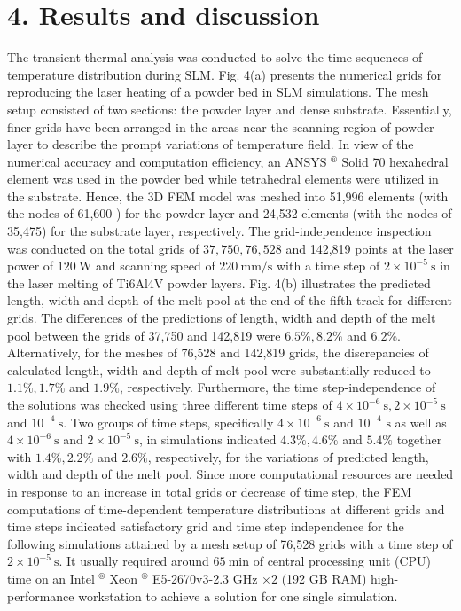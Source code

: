 \documentclass[10pt]{article}
\begin{document}
\section*{4. Results and discussion}
The transient thermal analysis was conducted to solve the time sequences of temperature distribution during SLM. Fig. 4(a) presents the numerical grids for reproducing the laser heating of a powder bed in SLM simulations. The mesh setup consisted of two sections: the powder layer and dense substrate. Essentially, finer grids have been arranged in the areas near the scanning region of powder layer to describe the prompt variations of temperature field. In view of the numerical accuracy and computation efficiency, an ANSYS ${ }^{\circledR}$ Solid 70 hexahedral element was used in the powder bed while tetrahedral elements were utilized in the substrate. Hence, the 3D FEM model was meshed into 51,996 elements (with the nodes of 61,600 ) for the powder layer and 24,532 elements (with the nodes of 35,475) for the substrate layer, respectively. The grid-independence inspection was conducted on the total grids of $37,750,76,528$ and 142,819 points at the laser power of $120 \mathrm{~W}$ and scanning speed of $220 \mathrm{~mm} / \mathrm{s}$ with a time step of $2 \times 10^{-5} \mathrm{~s}$ in the laser melting of Ti6Al4V powder layers. Fig. 4(b) illustrates the predicted length, width and depth of the melt pool at the end of the fifth track for different grids. The differences of the predictions of length, width and depth of the melt pool between the grids of 37,750 and 142,819 were $6.5 \%, 8.2 \%$ and $6.2 \%$. Alternatively, for the meshes of 76,528 and 142,819 grids, the discrepancies of calculated length, width and depth of melt pool were substantially reduced to $1.1 \%, 1.7 \%$ and $1.9 \%$, respectively. Furthermore, the time step-independence of the solutions was checked using three different time steps of $4 \times 10^{-6} \mathrm{~s}, 2 \times 10^{-5} \mathrm{~s}$ and $10^{-4} \mathrm{~s}$. Two groups of time steps, specifically $4 \times 10^{-6} \mathrm{~s}$ and $10^{-4}$ $\mathrm{s}$ as well as $4 \times 10^{-6} \mathrm{~s}$ and $2 \times 10^{-5} \mathrm{~s}$, in simulations indicated $4.3 \%, 4.6 \%$ and $5.4 \%$ together with $1.4 \%, 2.2 \%$ and $2.6 \%$, respectively, for the variations of predicted length, width and depth of the melt pool. Since more computational resources are needed in response to an increase in total grids or decrease of time step, the FEM computations of time-dependent temperature distributions at different grids and time steps indicated satisfactory grid and time step independence for the following simulations attained by a mesh setup of 76,528 grids with a time step of $2 \times 10^{-5} \mathrm{~s}$. It usually required around $65 \mathrm{~min}$ of central processing unit (CPU) time on an Intel ${ }^{\circledR}$ Xeon $^{\circledR}$ E5-2670v3-2.3 GHz $\times 2$ (192 GB RAM) high-performance workstation to achieve a solution for one single simulation.
\end{document}
